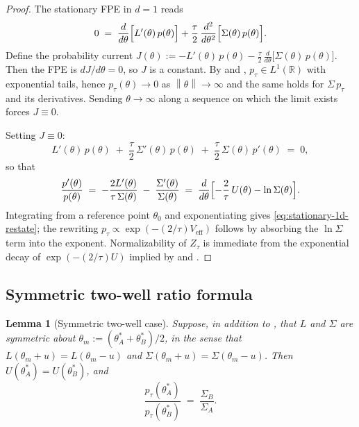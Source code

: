 \documentclass[11pt,a4paper]{article}
\newtheorem{lemma}[theorem]{Lemma}
\theoremstyle{definition}
\theoremstyle{remark}
\newcommand{\R}{\mathbb{R}}
\newcommand{\Veff}{V_{\mathrm{eff}}}
\newcommand{\norm}[1]{\left\|#1\right\|}
\begin{document}
\begin{proof}
   The stationary FPE in $d=1$ reads
   \[
      0 \;=\; \frac{d}{d\theta}\Bigl[L'(\theta)\,p(\theta)\Bigr]
            + \frac{\tau}{2}\,
              \frac{d^2}{d\theta^2}\Bigl[\Sigma(\theta)\,p(\theta)\Bigr].
   \]
   Define the probability current
   $J(\theta) := -L'(\theta)\,p(\theta) - \frac{\tau}{2}\,
                    \frac{d}{d\theta}\bigl[\Sigma(\theta)\,p(\theta)\bigr]$.
   Then the FPE is $dJ/d\theta = 0$, so $J$ is a constant.  By
    and , $p_\tau \in L^1(\R)$ with
   exponential tails, hence $p_\tau(\theta)\to 0$ as $\norm\theta\to\infty$
   and the same holds for $\Sigma\,p_\tau$ and its derivatives.
   Sending $\theta\to\infty$ along a sequence on which the limit exists
   forces $J\equiv 0$.

   Setting $J\equiv 0$:
   \[
      L'(\theta)\,p(\theta)
      \;+\; \frac{\tau}{2}\,\Sigma'(\theta)\,p(\theta)
      \;+\; \frac{\tau}{2}\,\Sigma(\theta)\,p'(\theta)
      \;=\; 0,
   \]
   so that
   \[
      \frac{p'(\theta)}{p(\theta)}
      \;=\; -\frac{2 L'(\theta)}{\tau\,\Sigma(\theta)}
            \;-\; \frac{\Sigma'(\theta)}{\Sigma(\theta)}
      \;=\; \frac{d}{d\theta}\Bigl[
                -\frac{2}{\tau}\,U(\theta) - \ln \Sigma(\theta)\Bigr].
   \]
   Integrating from a reference point $\theta_0$ and exponentiating gives
   \eqref{eq:stationary-1d-restate}; the rewriting
   $p_\tau \propto \exp(-(2/\tau)\Veff)$ follows by absorbing the $\ln
   \Sigma$ term into the exponent.  Normalizability of $Z_\tau$ is
   immediate from the exponential decay of $\exp(-(2/\tau)U)$ implied by
    and .
\end{proof}

\subsection{Symmetric two-well ratio formula}

\begin{lemma}[Symmetric two-well case]\label{lem:sym}
   Suppose, in addition to , that $L$ and $\Sigma$ are
   symmetric about $\theta_m := (\theta_A^* + \theta_B^*)/2$, in the sense
   that $L(\theta_m+u) = L(\theta_m-u)$ and $\Sigma(\theta_m+u)
   = \Sigma(\theta_m-u)$.  Then $U(\theta_A^*) = U(\theta_B^*)$, and
   \[
      \frac{p_\tau(\theta_A^*)}{p_\tau(\theta_B^*)}
      \;=\; \frac{\Sigma_B}{\Sigma_A}.
   \]
\end{lemma}
\end{document}
